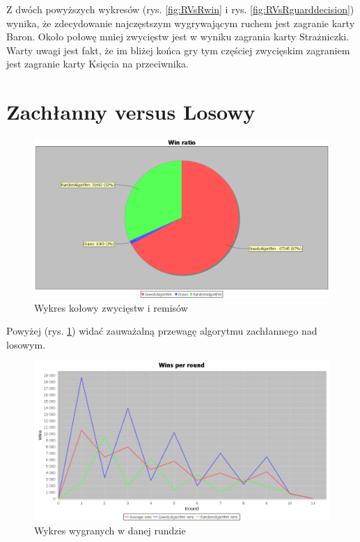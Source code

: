 Z dwóch powyższych wykresów (rys. \ref{fig:RVsRwin} i rys. \ref{fig:RVsRguarddecision}) wynika, że zdecydowanie najczęstszym wygrywającym ruchem jest zagranie karty Baron. Około połowę mniej zwycięstw jest w wyniku zagrania karty Strażniczki. Warty uwagi jest fakt, że im bliżej końca gry tym częściej zwycięskim zagraniem jest zagranie karty Księcia na przeciwnika.

\section{Zachłanny versus Losowy}

\begin{figure}[H]
	\centering
	\includegraphics[width=\textwidth]{Resources/GVsR/GVsRwin.PNG}
	\caption{Wykres kołowy zwycięstw i remisów} 
	\label{fig:GVsRwin}
\end{figure}

Powyżej (rys. \ref{fig:GVsRwin}) widać zauważalną przewagę algorytmu zachłannego nad losowym.

\begin{figure}[H]
	\centering
	\includegraphics[width=\textwidth]{Resources/GVsR/GVsRroundwin.PNG}
	\caption{Wykres wygranych w danej rundzie} 
	\label{fig:GVsRroundwin}
\end{figure}

